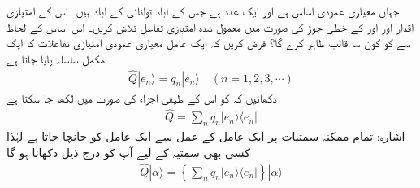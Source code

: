 جہاں  معیاری عمودی اساس ہے اور  ایک عدد ہے جس کے آباد توانائی کے آباد ہیں۔ اس کے امتیازی اقدار اور  اور  کے خطی جوڑ کی صورت میں معمول شدہ امتیازی تفاعل تلاش کریں۔ اس اساس کے لحاظ سے  کو کون سا قالب   ظاہر کرے گا؟ 
 فرض کریں کہ ایک عامل  معیاری عمودی امتیازی تفاعلات  کا ایک مکمل سلسلہ پایا جاتا ہے 
\begin{align*}
\hat{Q}|e_{n} \rangle = q_{n} | e_{n} \rangle \quad (n = 1,2,3,\cdots )
\end{align*}
دکھائیں کہ  کو اس کے طیفی  اجزاء کی صورت میں لکھا جا سکتا ہے 
\begin{align*}
\hat{Q} = \sum_{n} q_{n} | e_{n} \rangle \langle e_{n} |
\end{align*}
اشارہ: تمام ممکنہ سمتیات پر ایک عامل کے عمل سے ایک عامل کو جانچا جاتا ہے لہٰذا کسی بھی سمتیہ  کے لیے آپ کو درج ذیل دکھانا ہو گا 
\begin{align*}
\hat{Q} | \alpha \rangle = \left\{ \sum_{n} q_{n} | e_{n} \rangle \langle e_{n} | \right\} | \alpha \rangle 
\end{align*}


